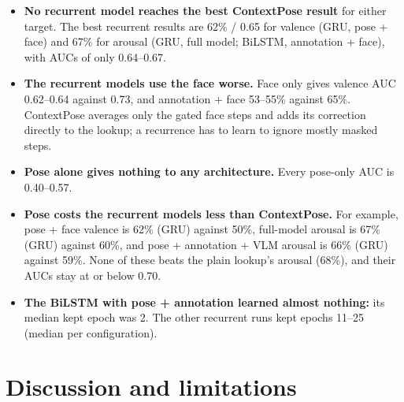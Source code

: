 \documentclass[11pt]{article}
\begin{document}
\begin{itemize}
  \item \textbf{No recurrent model reaches the best ContextPose result} for either target. The best recurrent results are 62\% / 0.65 for valence (GRU, pose + face) and 67\% for arousal (GRU, full model; BiLSTM, annotation + face), with AUCs of only 0.64--0.67.
  \item \textbf{The recurrent models use the face worse.} Face only gives valence AUC 0.62--0.64 against 0.73, and annotation + face 53--55\% against 65\%. ContextPose averages only the gated face steps and adds its correction directly to the lookup; a recurrence has to learn to ignore mostly masked steps.
  \item \textbf{Pose alone gives nothing to any architecture.} Every pose-only AUC is 0.40--0.57.
  \item \textbf{Pose costs the recurrent models less than ContextPose.} For example, pose + face valence is 62\% (GRU) against 50\%, full-model arousal is 67\% (GRU) against 60\%, and pose + annotation + VLM arousal is 66\% (GRU) against 59\%. None of these beats the plain lookup's arousal (68\%), and their AUCs stay at or below 0.70.
  \item \textbf{The BiLSTM with pose + annotation learned almost nothing:} its median kept epoch was 2. The other recurrent runs kept epochs 11--25 (median per configuration).
\end{itemize}

\section{Discussion and limitations}\label{sec:limits}
\end{document}
